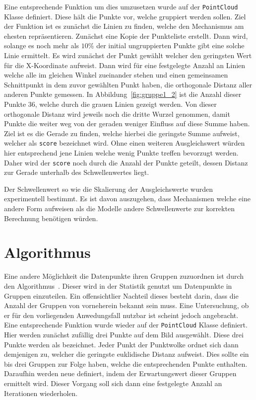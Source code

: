 Eine entsprechende Funktion um dies umzusetzen wurde auf der \lstinline{PointCloud} Klasse definiert.
Diese hält die Punkte vor, welche gruppiert werden sollen.
Ziel der Funktion ist es zunächst die Linien zu finden, welche den Mechanismus am ehesten repräsentieren.
Zunächst eine Kopie der Punkteliste erstellt.
Dann wird, solange es noch mehr als $10\%$ der initial ungruppierten Punkte gibt eine solche Linie ermittelt.
Es wird zunächst der Punkt gewählt welcher den geringsten Wert für die X-Koordinate aufweist.
Dann wird für eine festgelegte Anzahl an Linien welche alle im gleichen Winkel zueinander stehen und einen gemeinsamen Schnittpunkt in dem zuvor gewählten Punkt haben, die orthogonale Distanz aller anderen Punkte gemessen.
In Abbildung~\ref{fig:gruppe1_2} ist die Anzahl dieser Punkte 36, welche durch die grauen Linien gezeigt werden.
Von dieser orthogonale Distanz wird jeweils noch die dritte Wurzel genommen, damit Punkte die weiter weg von der geraden weniger Einfluss auf diese Summe haben.
Ziel ist es die Gerade zu finden, welche hierbei die geringste Summe aufweist, welcher als \lstinline{score} bezeichnet wird.
Ohne einen weiteren Ausgleichswert würden hier entsprechend jene Linien welche wenig Punkte treffen bevorzugt werden.
Daher wird der \lstinline{score} noch durch die Anzahl der Punkte geteilt, dessen Distanz zur Gerade unterhalb des Schwellenwertes liegt.

Der Schwellenwert so wie die Skalierung der Ausgleichswerte wurden experimentell bestimmt.
Es ist davon auszugehen, dass Mechanismen welche eine andere Form aufweisen als die  Modelle andere Schwellenwerte zur korrekten Berechnung benötigen würden.

\section{ Algorithmus}

Eine andere Möglichkeit die Datenpunkte ihren Gruppen zuzuordnen ist durch den  Algorithmus~\cite[S.~241]{Geron2019}.
Dieser wird in der Statistik genutzt um Datenpunkte in Gruppen einzuteilen.
Ein offensichtlier Nachteil dieses besteht darin, dass die Anzahl der Gruppen von vorneherein bekannt sein muss.
Eine Untersuchung, ob er für den vorliegenden Anwedungsfall nutzbar ist scheint jedoch angebracht.
Eine entsprechende Funktion wurde wieder auf der \lstinline{PointCloud} Klasse definiert.
Hier werden zunächst zufällig drei Punkte auf dem Bild ausgewählt.
Diese drei Punkte werden als  bezeichnet.
Jeder Punkt der Punktwolke ordnet sich dann demjenigen  zu, welcher die geringste euklidische Distanz aufweist.
Dies sollte ein bis drei Gruppen zur Folge haben, welche die entsprechenden Punkte enthalten.
Daraufhin werden neue  definiert, indem der Erwartungswert dieser Gruppen ermittelt wird.
Dieser Vorgang soll sich dann eine festgelegte Anzahl an Iterationen wiederholen.

